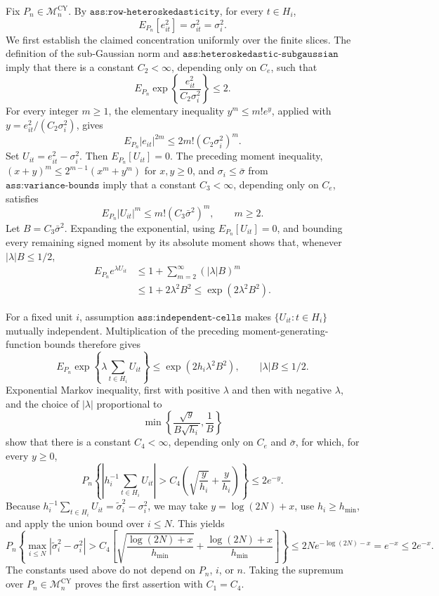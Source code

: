 Fix \(P_n\in\mathcal M_n^{\mathrm{CY}}\).  By
\(\texttt{ass:row-heteroskedasticity}\), for every \(t\in H_i\),
\[
 E_{P_n}[e_{it}^2]=\sigma_{it}^2=\sigma_i^2.
\]
We first establish the claimed concentration uniformly over the finite
slices.  The definition of the sub-Gaussian norm and
\(\texttt{ass:heteroskedastic-subgaussian}\) imply that there is a
constant \(C_2<\infty\), depending only on \(C_e\), such that
\[
 E_{P_n}\exp\!\left\{\frac{e_{it}^2}{C_2\sigma_i^2}\right\}\le2.
\]
For every integer \(m\ge1\), the elementary inequality
\(y^m\le m!e^y\), applied with
\(y=e_{it}^2/(C_2\sigma_i^2)\), gives
\[
 E_{P_n}|e_{it}|^{2m}
 \le 2m!(C_2\sigma_i^2)^m.
\]
Set \(U_{it}=e_{it}^2-\sigma_i^2\).  Then
\(E_{P_n}[U_{it}]=0\).  The preceding moment inequality,
\((x+y)^m\le2^{m-1}(x^m+y^m)\) for \(x,y\ge0\), and
\(\sigma_i\le\bar\sigma\) from \(\texttt{ass:variance-bounds}\) imply
that a constant \(C_3<\infty\), depending only on \(C_e\), satisfies
\[
 E_{P_n}|U_{it}|^m\le m!(C_3\bar\sigma^2)^m,
 \qquad m\ge2.
\]
Let \(B=C_3\bar\sigma^2\).  Expanding the exponential, using
\(E_{P_n}[U_{it}]=0\), and bounding every remaining signed moment by its
absolute moment shows that, whenever \(|\lambda|B\le1/2\),
\[
 \begin{aligned}
 E_{P_n}e^{\lambda U_{it}}
 &\le 1+\sum_{m=2}^{\infty}(|\lambda|B)^m\\
 &\le 1+2\lambda^2B^2
 \le \exp(2\lambda^2B^2).
 \end{aligned}
\]

For a fixed unit \(i\), assumption \(\texttt{ass:independent-cells}\)
makes \(\{U_{it}:t\in H_i\}\) mutually independent.  Multiplication of
the preceding moment-generating-function bounds therefore gives
\[
 E_{P_n}\exp\!\left\{\lambda\sum_{t\in H_i}U_{it}\right\}
 \le \exp(2h_i\lambda^2B^2),
 \qquad |\lambda|B\le1/2.
\]
Exponential Markov inequality, first with positive \(\lambda\) and then
with negative \(\lambda\), and the choice of \(|\lambda|\) proportional
to
\[
 \min\!\left\{\frac{\sqrt y}{B\sqrt{h_i}},\frac1B\right\}
\]
show that there is a constant \(C_4<\infty\), depending only on
\(C_e\) and \(\bar\sigma\), for which, for every \(y\ge0\),
\[
 P_n\!\left\{
 \left|h_i^{-1}\sum_{t\in H_i}U_{it}\right|
 >C_4\left(\sqrt{\frac y{h_i}}+\frac y{h_i}\right)
 \right\}\le2e^{-y}.
\]
Because
\(h_i^{-1}\sum_{t\in H_i}U_{it}=\widetilde\sigma_i^2-\sigma_i^2\),
we may take \(y=\log(2N)+x\), use \(h_i\ge h_{\min}\), and apply the
union bound over \(i\le N\).  This yields
\[
 P_n\!\left\{
 \max_{i\le N}|\widetilde\sigma_i^2-\sigma_i^2|
 >C_4\left[
 \sqrt{\frac{\log(2N)+x}{h_{\min}}}
 +\frac{\log(2N)+x}{h_{\min}}
 \right]\right\}
 \le 2N e^{-\log(2N)-x}=e^{-x}\le2e^{-x}.
\]
The constants used above do not depend on \(P_n\), \(i\), or \(n\).
Taking the supremum over \(P_n\in\mathcal M_n^{\mathrm{CY}}\) proves the
first assertion with \(C_1=C_4\).

